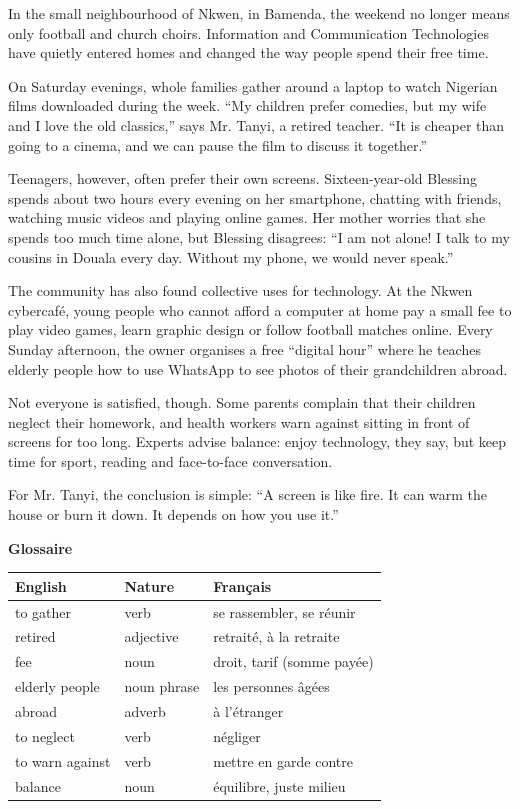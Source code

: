 \documentclass[11pt]{article}
\begin{document}
\begin{textebox}
In the small neighbourhood of Nkwen, in Bamenda, the weekend no longer means only football and church choirs. Information and Communication Technologies have quietly entered homes and changed the way people spend their free time.

On Saturday evenings, whole families gather around a laptop to watch Nigerian films downloaded during the week. “My children prefer comedies, but my wife and I love the old classics,” says Mr. Tanyi, a retired teacher. “It is cheaper than going to a cinema, and we can pause the film to discuss it together.”

Teenagers, however, often prefer their own screens. Sixteen-year-old Blessing spends about two hours every evening on her smartphone, chatting with friends, watching music videos and playing online games. Her mother worries that she spends too much time alone, but Blessing disagrees: “I am not alone! I talk to my cousins in Douala every day. Without my phone, we would never speak.”

The community has also found collective uses for technology. At the Nkwen cybercafé, young people who cannot afford a computer at home pay a small fee to play video games, learn graphic design or follow football matches online. Every Sunday afternoon, the owner organises a free “digital hour” where he teaches elderly people how to use WhatsApp to see photos of their grandchildren abroad.

Not everyone is satisfied, though. Some parents complain that their children neglect their homework, and health workers warn against sitting in front of screens for too long. Experts advise balance: enjoy technology, they say, but keep time for sport, reading and face-to-face conversation.

For Mr. Tanyi, the conclusion is simple: “A screen is like fire. It can warm the house or burn it down. It depends on how you use it.”
\end{textebox}

\textbf{Glossaire}

\begin{center}
\begin{tabularx}{\linewidth}{|l|l|X|}
\hline
\rowcolor{popblueL} \textbf{English} & \textbf{Nature} & \textbf{Français} \\
\hline
to gather & verb & se rassembler, se réunir \\
\hline
retired & adjective & retraité, à la retraite \\
\hline
fee & noun & droit, tarif (somme payée) \\
\hline
elderly people & noun phrase & les personnes âgées \\
\hline
abroad & adverb & à l'étranger \\
\hline
to neglect & verb & négliger \\
\hline
to warn against & verb & mettre en garde contre \\
\hline
balance & noun & équilibre, juste milieu \\
\hline
\end{tabularx}
\end{center}
\end{document}
